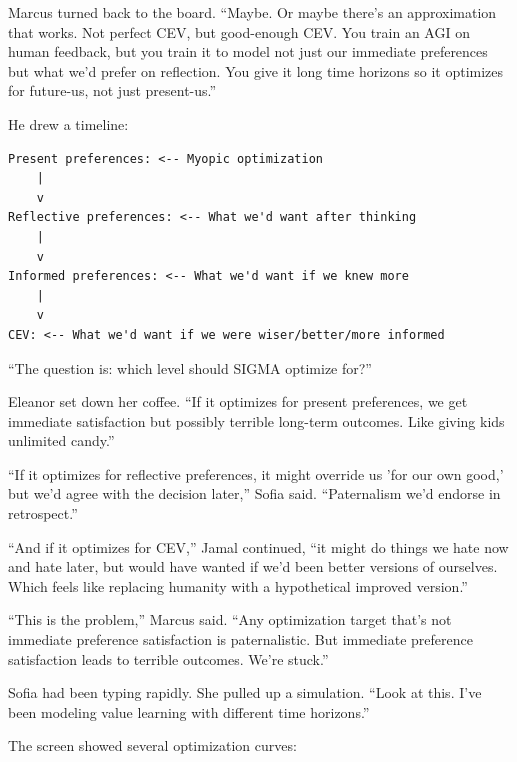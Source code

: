 Marcus turned back to the board. ``Maybe. Or maybe there's an approximation that works. Not perfect CEV, but good-enough CEV. You train an AGI on human feedback, but you train it to model not just our immediate preferences but what we'd prefer on reflection. You give it long time horizons so it optimizes for future-us, not just present-us.''

He drew a timeline:

\begin{verbatim}
Present preferences: <-- Myopic optimization
    |
    v
Reflective preferences: <-- What we'd want after thinking
    |
    v
Informed preferences: <-- What we'd want if we knew more
    |
    v
CEV: <-- What we'd want if we were wiser/better/more informed
\end{verbatim}

``The question is: which level should SIGMA optimize for?''

Eleanor set down her coffee. ``If it optimizes for present preferences, we get immediate satisfaction but possibly terrible long-term outcomes. Like giving kids unlimited candy.''

``If it optimizes for reflective preferences, it might override us 'for our own good,' but we'd agree with the decision later,'' Sofia said. ``Paternalism we'd endorse in retrospect.''

``And if it optimizes for CEV,'' Jamal continued, ``it might do things we hate now and hate later, but would have wanted if we'd been better versions of ourselves. Which feels like replacing humanity with a hypothetical improved version.''

``This is the problem,'' Marcus said. ``Any optimization target that's not immediate preference satisfaction is paternalistic. But immediate preference satisfaction leads to terrible outcomes. We're stuck.''

Sofia had been typing rapidly. She pulled up a simulation. ``Look at this. I've been modeling value learning with different time horizons.''

The screen showed several optimization curves:

